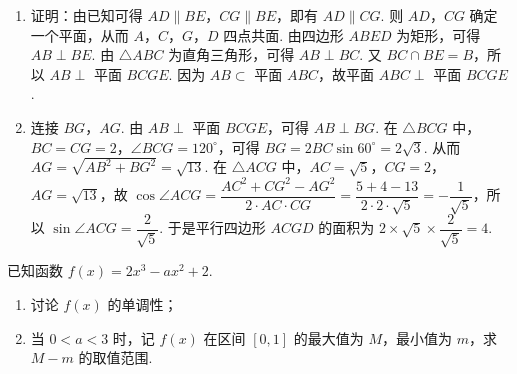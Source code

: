 \begin{solution}
\begin{enumerate}
\item 证明：由已知可得 \(AD\parallel BE\)，\(CG\parallel BE\)，即有 \(AD\parallel CG\).
则 \(AD\)，\(CG\) 确定一个平面，从而 \(A\)，\(C\)，\(G\)，\(D\) 四点共面.
由四边形 \(ABED\) 为矩形，可得 \(AB\perp BE\).
由 \(\triangle ABC\) 为直角三角形，可得 \(AB\perp BC\).
又 \(BC\cap BE=B\)，所以 \(AB\perp\) 平面 \(BCGE\).
因为 \(AB\subset\) 平面 \(ABC\)，故平面 \(ABC\perp\) 平面 \(BCGE\).

\item 连接 \(BG\)，\(AG\).
由 \(AB\perp\) 平面 \(BCGE\)，可得 \(AB\perp BG\).
在 \(\triangle BCG\) 中，\(BC=CG=2\)，\(\angle BCG=120^\circ\)，可得 \(BG=2BC\sin60^\circ=2\sqrt3\). 从而 \(AG=\sqrt{AB^2+BG^2}=\sqrt{13}\). 在 \(\triangle ACG\) 中，\(AC=\sqrt5\)，\(CG=2\)，\(AG=\sqrt{13}\)，故 \(\cos\angle ACG=\dfrac{AC^2+CG^2-AG^2}{2\cdot AC\cdot CG}=\dfrac{5+4-13}{2\cdot2\cdot\sqrt5}=-\dfrac1{\sqrt5}\)，所以 \(\sin\angle ACG=\dfrac2{\sqrt5}\). 于是平行四边形 \(ACGD\) 的面积为 \(2\times\sqrt5\times\dfrac2{\sqrt5}=4\).
\end{enumerate}
\end{solution}

\begin{problem}
已知函数 \(f(x)=2x^3-ax^2+2\).

\begin{enumerate}
\item 讨论 \(f(x)\) 的单调性；
\item 当 \(0<a<3\) 时，记 \(f(x)\) 在区间 \([0,1]\) 的最大值为 \(M\)，最小值为 \(m\)，求 \(M-m\) 的取值范围.
\end{enumerate}
\end{problem}

